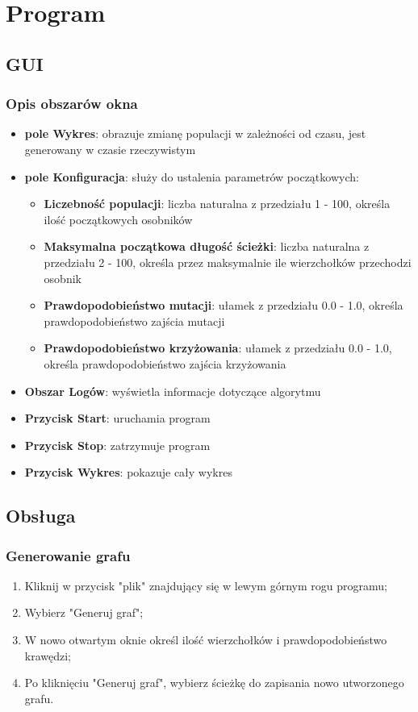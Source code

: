 \documentclass[a4paper,12pt]{article}
\begin{document}
\section{Program}
\subsection{GUI}
\subsubsection{Opis obszarów okna}
\begin{itemize}
\item \textbf{pole Wykres}: obrazuje zmianę populacji w zależności od czasu, jest generowany w czasie rzeczywistym
\item \textbf{pole Konfiguracja}: służy do ustalenia parametrów początkowych:
\begin{itemize}
\item \textbf{Liczebność populacji}: liczba naturalna z przedziału 1 - 100, określa ilość początkowych osobników
\item \textbf{Maksymalna początkowa długość ścieżki}: liczba naturalna z przedziału 2 - 100, określa przez maksymalnie ile wierzchołków przechodzi osobnik
\item \textbf{Prawdopodobieństwo mutacji}: ułamek z przedziału 0.0 - 1.0, określa prawdopodobieństwo zajścia mutacji
\item \textbf{Prawdopodobieństwo krzyżowania}: ułamek z przedziału 0.0 - 1.0, określa prawdopodobieństwo zajścia krzyżowania
\end{itemize}
\item \textbf{Obszar Logów}: wyświetla informacje dotyczące algorytmu
\item \textbf{Przycisk Start}: uruchamia program
\item \textbf{Przycisk Stop}: zatrzymuje program
\item \textbf{Przycisk Wykres}: pokazuje cały wykres
\end{itemize}
\subsection{Obsługa}
\subsubsection{Generowanie grafu}
\begin{enumerate}
\item Kliknij w przycisk "plik" znajdujący się w lewym górnym rogu programu;
\item Wybierz "Generuj graf";
\item W nowo otwartym oknie określ ilość wierzchołków i prawdopodobieństwo krawędzi;
\item Po kliknięciu "Generuj graf", wybierz ścieżkę do zapisania nowo utworzonego grafu.
\end{enumerate}
\end{document}

